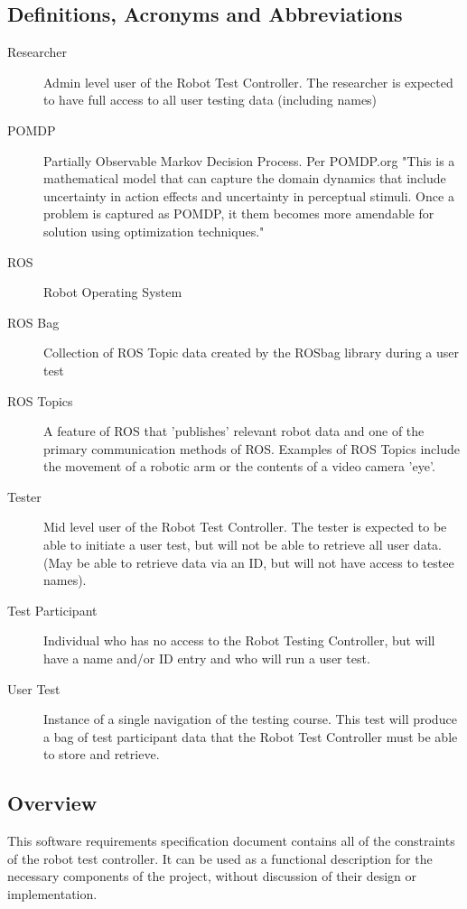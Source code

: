 \documentclass[onecolumn, draftclsnofoot,10pt, compsoc]{report}
\begin{document}
	\subsection{Definitions, Acronyms and Abbreviations}
	\begin{description}
		\item [Researcher] \hfill \break Admin level user of the Robot Test Controller. The researcher is expected to have full access to all user testing data (including names)
		\item [POMDP] \hfill \break Partially Observable Markov Decision Process. Per POMDP.org "This is a mathematical model that can capture the domain dynamics that include uncertainty in action effects and uncertainty in perceptual stimuli. Once a problem is captured as POMDP, it them becomes more amendable for solution using optimization techniques." \cite{1}
		\item [ROS] \hfill \break Robot Operating System
		\item [ROS Bag] \hfill \break Collection of ROS Topic data created by the ROSbag library during a user test
		\item [ROS Topics] \hfill \break A feature of ROS that 'publishes' relevant robot data and one of the primary communication methods of ROS. \cite{3} Examples of ROS Topics include the movement of a robotic arm or the contents of a video camera 'eye'. 
		\item [Tester] \hfil \break Mid level user of the Robot Test Controller. The tester is expected to be able to initiate a user test, but will not be able to retrieve all user data. (May be able to retrieve data via an ID, but will not have access to testee names).
		\item [Test Participant] \hfill \break Individual who has no access to the Robot Testing Controller, but will have a name and/or ID entry and who will run a user test.
		\item [User Test] \hfill \break Instance of a single navigation of the testing course. This test will produce a bag of test participant data that the Robot Test Controller must be able to store and retrieve.
	\end{description}
	
	\subsection{Overview}
	This software requirements specification document contains all of the constraints of the robot test controller. It can be used as a functional description for the necessary components of the project, without discussion of their design or implementation.
	
\end{document}
